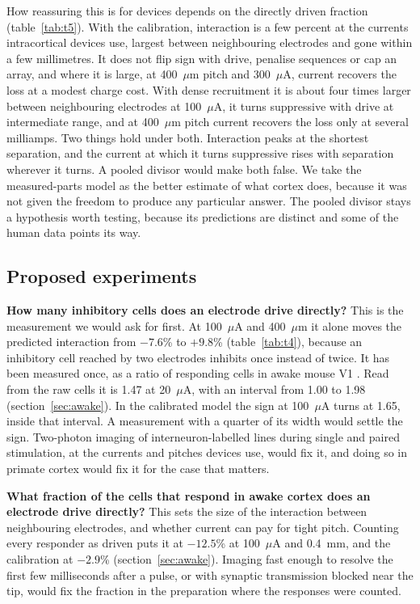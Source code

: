 \documentclass[10pt,twocolumn]{article}
\newcommand{\um}{\ensuremath{\mu\text{m}}}
\newcommand{\uA}{\ensuremath{\mu\text{A}}}
\begin{document}
How reassuring this is for devices depends on the directly driven
fraction (table~\ref{tab:t5}). With the calibration, interaction is a few
percent at the currents intracortical devices use, largest between
neighbouring electrodes and gone within a few millimetres. It does not
flip sign with drive, penalise sequences or cap an array, and where it is
large, at 400~\um{} pitch and 300~\uA, current recovers the loss at a
modest charge cost. With dense recruitment it is about four times larger
between neighbouring electrodes at 100~\uA, it turns suppressive with
drive at intermediate range, and at 400~\um{} pitch current recovers the
loss only at several milliamps. Two things hold under both. Interaction
peaks at the shortest separation, and the current at which it turns
suppressive rises with separation wherever it turns. A pooled divisor
would make both false. We take the measured-parts model as the
better estimate of what cortex does, because it was not given the freedom
to produce any particular answer. The pooled divisor stays a hypothesis
worth testing, because its predictions are distinct and some of the human
data points its way.

\subsection{Proposed experiments}
\label{sec:experiments}

\textbf{How many inhibitory cells does an electrode drive directly?} This
is the measurement we would ask for first. At 100~\uA{} and 400~\um{} it
alone moves the predicted interaction from $-7.6$\% to $+9.8$\%
(table~\ref{tab:t4}), because an inhibitory cell reached by two electrodes
inhibits once instead of twice. It has been measured once, as a ratio of
responding cells in awake mouse V1 \citep{dadarlat2024}. Read from the raw
cells it is 1.47 at 20~\uA, with an interval from 1.00 to 1.98
(section~\ref{sec:awake}). In the calibrated model the sign at 100~\uA{}
turns at 1.65, inside that interval. A measurement with a quarter of its
width would settle the sign.
Two-photon imaging
of interneuron-labelled lines during single and paired stimulation, at the
currents and pitches devices use, would fix it, and doing so in primate
cortex would fix it for the case that matters.

\textbf{What fraction of the cells that respond in awake cortex does an
electrode drive directly?} This sets the size of the interaction between
neighbouring electrodes, and whether current can pay for tight pitch. Counting every responder as driven puts it at
$-12.5$\% at 100~\uA{} and 0.4~mm, and the calibration at $-2.9$\%
(section~\ref{sec:awake}). Imaging fast enough to resolve the first few
milliseconds after a pulse, or with synaptic transmission blocked near the
tip, would fix the fraction in the preparation where the responses were
counted.
\end{document}
